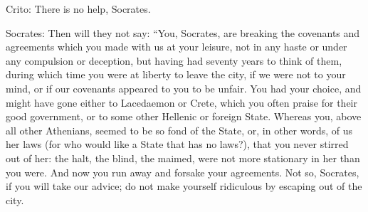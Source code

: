 Crito: There is no help, Socrates. 

Socrates: Then will they not say: ``You, Socrates, are breaking the covenants
and agreements which you made with us at your leisure, not in any
haste or under any compulsion or deception, but having had seventy
years to think of them, during which time you were at liberty to leave
the city, if we were not to your mind, or if our covenants appeared
to you to be unfair. You had your choice, and might have gone either
to Lacedaemon or Crete, which you often praise for their good government,
or to some other Hellenic or foreign State. Whereas you, above all
other Athenians, seemed to be so fond of the State, or, in other words,
of us her laws (for who would like a State that has no laws?), that
you never stirred out of her: the halt, the blind, the maimed, were
not more stationary in her than you were. And now you run away and
forsake your agreements. Not so, Socrates, if you will take our advice;
do not make yourself ridiculous by escaping out of the city.

